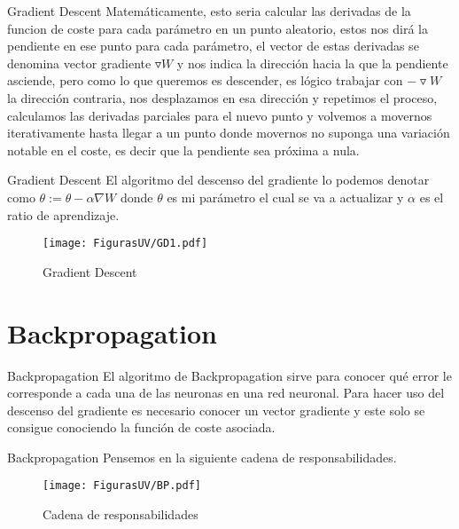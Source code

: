 \documentclass[10pt]{beamer}
\begin{document}
\begin{frame}{Gradient Descent}
Matemáticamente, esto seria calcular las derivadas de la funcion de coste para cada parámetro en un punto aleatorio, estos nos dirá la pendiente en ese punto para cada parámetro, el vector de estas derivadas se denomina vector gradiente $\triangledown W$ y nos indica la dirección hacia la que la pendiente asciende, pero como lo que queremos es descender, es lógico trabajar con $-\triangledown W$ la dirección contraria, nos desplazamos en esa dirección y repetimos el proceso, calculamos las derivadas parciales para el nuevo punto y volvemos a movernos iterativamente hasta llegar a un punto donde movernos no suponga una variación notable en el coste, es decir que la pendiente sea próxima a nula.

\end{frame}

\begin{frame}{Gradient Descent}
El algoritmo del descenso del gradiente lo podemos denotar como $\theta:=\theta-\alpha\nabla W$ donde $\theta$ es mi parámetro el cual se va a actualizar y $\alpha$ es el  ratio de aprendizaje. 

\begin{figure}[h!]
  \centering
  \texttt{[image: FigurasUV/GD1.pdf]}
  \caption{Gradient Descent}
\end{figure}
 
\end{frame}


\section{Backpropagation}
\begin{frame}{Backpropagation}
El algoritmo de Backpropagation sirve para conocer qué error le corresponde a cada una de las neuronas en una red neuronal. Para hacer uso del descenso del gradiente es necesario conocer un vector gradiente y este solo se consigue conociendo la función de coste asociada.


\end{frame}

\begin{frame}{Backpropagation}
Pensemos en la siguiente cadena de responsabilidades.

\begin{figure}[h!]
  \centering
  \texttt{[image: FigurasUV/BP.pdf]}
  \caption{Cadena de responsabilidades}
\end{figure}


\end{frame}
\end{document}
